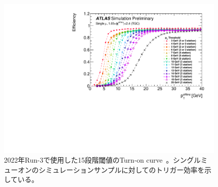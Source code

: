 \begin{figure}[tb]
  \centering
  \includegraphics[clip, width=14cm]{fig/3/PLOT-TRIG-2020-01-fig1.pdf}
  \caption{2022年Run-3で使用した15段階閾値のTurn-on curve~\cite{article:shiomi-mron}。シングルミューオンのシミュレーションサンプルに対してのトリガー効率を示している。}
  \label{fig:Run3_15_MC5}
\end{figure}


